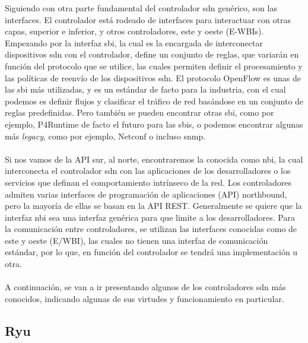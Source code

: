 Siguiendo con otra parte fundamental del controlador \gls{sdn} genérico, son las interfaces. El controlador está rodeado de interfaces para interactuar con otras capas, superior e inferior, y otros controladores, este y oeste (E-WBIs). Empezando por la interfaz \gls{sbi}, la cual es la encargada de interconectar dispositivos \gls{sdn} con el controlador, define un conjunto de reglas, que variarán en función del protocolo que se utilice, las cuales permiten definir el procesamiento y las políticas de reenvío de los dispositivos \gls{sdn}. El protocolo OpenFlow es unas de las \gls{sbi} más utilizadas, y es un estándar de facto para la industria, con el cual podemos es definir flujos y clasificar el tráfico de red basándose en un conjunto de reglas predefinidas. Pero también se pueden encontrar otras \gls{sbi}, como por ejemplo, P4Runtime de facto el futuro para las \gls{sbi}s, o podemos encontrar algunas más \textit{legacy}, como por ejemplo, Netconf o incluso \gls{snmp}.\\
\\
Si nos vamos de la API sur, al norte, encontraremos la conocida como \gls{nbi}, la cual interconecta el controlador \gls{sdn} con las aplicaciones de los desarrolladores o los servicios que definan el comportamiento intrínseco de la red. Los controladores admiten varias interfaces de programación de aplicaciones (API) northbound, pero la mayoría de ellas se basan en la API REST. Generalmente se quiere que la interfaz \gls{nbi} sea una interfaz genérica para que limite a los desarrolladores. Para la comunicación entre controladores, se utilizan las interfaces conocidas como de este y oeste (E/WBI), las cuales no tienen una interfaz de comunicación estándar, por lo que, en función del controlador se tendrá una implementación u otra.\\
\\
A continuación, se van a ir presentando algunos de los controladores \gls{sdn} más conocidos, indicando algunas de sus virtudes y funcionamiento en particular.

\subsection{Ryu}
\label{subsec:ryu}

